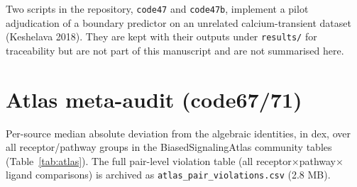 \documentclass[11pt]{article}
\begin{document}
\noindent Two scripts in the repository, \texttt{code47} and \texttt{code47b}, implement a
pilot adjudication of a boundary predictor on an unrelated calcium-transient dataset
(Keshelava 2018). They are kept with their outputs under \texttt{results/} for traceability but
are not part of this manuscript and are not summarised here.
\section{Atlas meta-audit (code67/71)}

Per-source median absolute deviation from the algebraic identities, in
dex, over all receptor/pathway groups in the BiasedSignalingAtlas
community tables (Table~\ref{tab:atlas}). The full pair-level violation
table (all receptor$\times$pathway$\times$ligand comparisons) is archived
as \texttt{atlas\_pair\_violations.csv} (2.8 MB).
\end{document}

